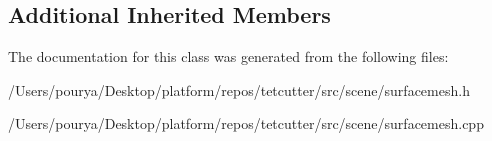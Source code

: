 \subsection*{Additional Inherited Members}


The documentation for this class was generated from the following files\+:\begin{DoxyCompactItemize}
\item 
/\+Users/pourya/\+Desktop/platform/repos/tetcutter/src/scene/surfacemesh.\+h\item 
/\+Users/pourya/\+Desktop/platform/repos/tetcutter/src/scene/surfacemesh.\+cpp\end{DoxyCompactItemize}
